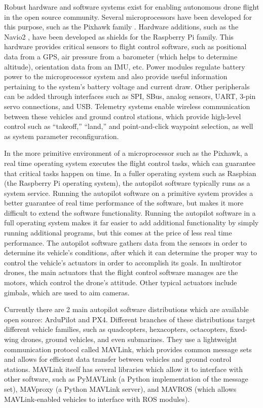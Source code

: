 Robust hardware and software systems exist for enabling autonomous drone flight in the open source community. Several microprocessors have been developed for this purpose, such as the Pixhawk family \cite{pixhawk_website}. Hardware additions, such as the Navio2 \cite{navio2_website}, have been developed as shields for the Raspberry Pi family. This hardware provides critical sensors to flight control software, such as positional data from a \gls{GPS}, air pressure from a barometer (which helps to determine altitude), orientation data from an \gls{IMU}, etc. Power modules regulate battery power to the microprocessor system and also provide useful information pertaining to the system's battery voltage and current draw. Other peripherals can be added through interfaces such as SPI, SBus, analog sensors, UART, 3-pin servo connections, and USB. Telemetry systems enable wireless communication between these vehicles and ground control stations, which provide high-level control such as ``takeoff,'' ``land,'' and point-and-click waypoint selection, as well as system parameter reconfiguration.

In the more primitive environment of a microprocessor such as the Pixhawk, a real time operating system executes the flight control tasks, which can guarantee that critical tasks happen on time. In a fuller operating system such as Raspbian (the Raspberry Pi operating system), the autopilot software typically runs as a system service. Running the autopilot software on a primitive system provides a better guarantee of real time performance of the software, but makes it more difficult to extend the software functionality. Running the autopilot software in a full operating system makes it far easier to add additional functionality by simply running additional programs, but this comes at the price of less real time performance. The autopilot software gathers data from the sensors in order to determine its vehicle's conditions, after which it can determine the proper way to control the vehicle's actuators in order to accomplish its goals. In multirotor drones, the main actuators that the flight control software manages are the motors, which control the drone's attitude. Other typical actuators include gimbals, which are used to aim cameras.

Currently there are 2 main autopilot software distributions which are available open source: ArduPilot and PX4. Different branches of these distributions target different vehicle families, such as quadcopters, hexacopters, octacopters, fixed-wing drones, ground vehicles, and even submarines. They use a lightweight communication protocol called MAVLink, which provides common message sets and allows for efficient data transfer between vehicles and ground control stations. MAVLink itself has several libraries which allow it to interface with other software, such as PyMAVLink (a Python implementation of the message set), MAVproxy (a Python MAVLink server), and MAVROS (which allows MAVLink-enabled vehicles to interface with ROS modules).